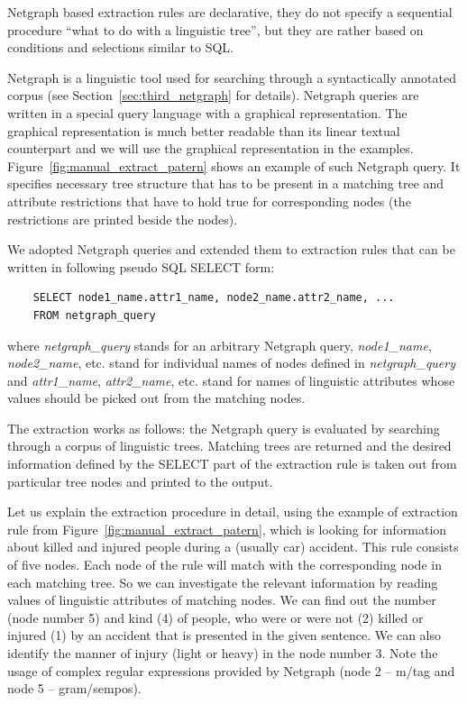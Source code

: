Netgraph based extraction rules are declarative, they do not specify a sequential procedure ``what to do with a linguistic tree'', but they are rather based on conditions and selections similar to SQL.

Netgraph is a linguistic tool used for searching through a syntactically annotated corpus (see Section~\ref{sec:third_netgraph} for details). Netgraph queries are written in a special query language with a graphical representation. The graphical representation is much better readable than its linear textual counterpart and we will use the graphical representation in the examples. Figure~\ref{fig:manual_extract_patern} shows an example of such Netgraph query. It specifies necessary tree structure that has to be present in a matching tree and attribute restrictions that have to hold true for corresponding nodes (the restrictions are printed beside the nodes).



We adopted Netgraph queries and extended them to extraction rules that can be written in following pseudo SQL SELECT form:


\begin{verbatim}
	SELECT node1_name.attr1_name, node2_name.attr2_name, ... 
	FROM netgraph_query
\end{verbatim}

where \emph{netgraph\_query} stands for an arbitrary Netgraph query, \emph{node1\_name}, \emph{node2\_name}, etc. stand for individual names of nodes defined in \emph{netgraph\_query} and \emph{attr1\_name}, \emph{attr2\_name}, etc. stand for names of linguistic attributes whose values should be picked out from the matching nodes.

The extraction works as follows: the Netgraph query is evaluated by searching through a corpus of linguistic trees. Matching trees are returned and the desired information defined by the SELECT part of the extraction rule is taken out from particular tree nodes and printed to the output.

Let us explain the extraction procedure in detail, using the example of extraction rule from Figure~\ref{fig:manual_extract_patern}, which is looking for information about killed and injured people during a (usually car) accident. This rule consists of five nodes. Each node of the rule will match with the corresponding node in each matching tree. So we can investigate the relevant information by reading values of linguistic attributes of matching nodes. We can find out the number (node number 5) and kind (4) of people, who were or were not (2) killed or injured (1) by an accident that is presented in the given sentence. We can also identify the manner of injury (light or heavy) in the node number 3. Note the usage of complex regular expressions provided by Netgraph (node 2 -- m/tag and node 5 -- gram/sempos).

